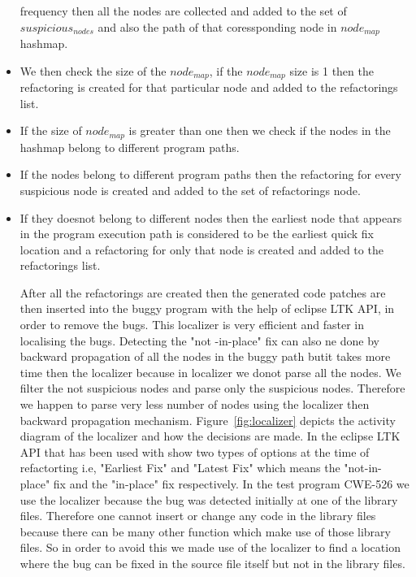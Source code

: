 \begin{itemize}
 frequency then all the nodes are collected and added to the set of $suspicious_{nodes}$
 and also the path of that coressponding node in $node_{map}$ hashmap.
 \item We then check the size of the $node_{map}$, if the $node_{map}$ size is 1 then 
 the refactoring is created for that particular node and added to the refactorings list.
 \item If the size of $node_{map}$ is greater than one then we check if the nodes 
 in the hashmap belong to different program paths.
 \item If the nodes belong to different program paths then the refactoring for 
 every suspicious node is created and added to the set of refactorings node.
 \item If they doesnot belong to different nodes then the earliest node
 that appears in the program execution path is considered to be the 
 earliest quick fix location and a refactoring for only that node is created and added
 to the refactorings list.
 
 
 After all the refactorings are created then the generated code patches are 
 then inserted
 into the buggy program with the help of eclipse LTK API, in order to remove the bugs.
 This localizer is very efficient and faster in localising the bugs. Detecting the "not 
-in-place" fix can also ne done by backward propagation of all the nodes in the 
buggy path butit takes more time then the localizer because in localizer
we donot parse all the nodes. We filter the not suspicious nodes and 
parse only the suspicious nodes. Therefore we happen to parse very less number
of nodes using the localizer then backward propagation mechanism. Figure~\ref{fig:localizer}
depicts the activity diagram of the localizer and how the decisions are made.
In the eclipse LTK API that has been used with show two types of options
at the time of refactorting i.e, "Earliest Fix" and "Latest Fix" which means the
"not-in-place" fix and the "in-place" fix respectively. In the test program CWE-526
we use the localizer because the bug was detected initially at one of the library files.
Therefore one cannot insert or change any code in the library files because
there can be many other function which make use of those library files. So in order to
avoid this we made use of the localizer to find a location where the bug can be
fixed in the source file itself but not in the library files.
 
\end{itemize}

